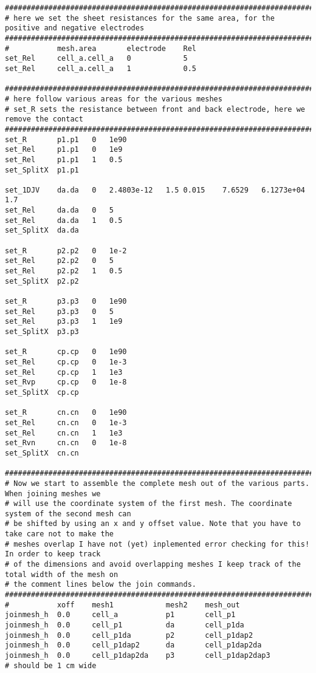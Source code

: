 \documentclass[noshowpacs,preprintnumbers,amsmath,amssymb, letter]{revtex4}
\begin{document}
\begin{small}
\begin{verbatim}
###################################################################################################
# here we set the sheet resistances for the same area, for the positive and negative electrodes
###################################################################################################
#           mesh.area       electrode    Rel
set_Rel     cell_a.cell_a   0            5
set_Rel     cell_a.cell_a   1            0.5

###################################################################################################
# here follow various areas for the various meshes
# set_R sets the resistance between front and back electrode, here we remove the contact
###################################################################################################
set_R       p1.p1   0   1e90
set_Rel     p1.p1   0   1e9
set_Rel     p1.p1   1   0.5
set_SplitX  p1.p1

set_1DJV    da.da   0   2.4803e-12   1.5 0.015    7.6529   6.1273e+04  1.7
set_Rel     da.da   0   5
set_Rel     da.da   1   0.5
set_SplitX  da.da
  
set_R       p2.p2   0   1e-2
set_Rel     p2.p2   0   5
set_Rel     p2.p2   1   0.5
set_SplitX  p2.p2

set_R       p3.p3   0   1e90
set_Rel     p3.p3   0   5
set_Rel     p3.p3   1   1e9
set_SplitX  p3.p3

set_R       cp.cp   0   1e90
set_Rel     cp.cp   0   1e-3
set_Rel     cp.cp   1   1e3
set_Rvp     cp.cp   0   1e-8
set_SplitX  cp.cp

set_R       cn.cn   0   1e90
set_Rel     cn.cn   0   1e-3
set_Rel     cn.cn   1   1e3
set_Rvn     cn.cn   0   1e-8
set_SplitX  cn.cn

###################################################################################################
# Now we start to assemble the complete mesh out of the various parts. When joining meshes we 
# will use the coordinate system of the first mesh. The coordinate system of the second mesh can 
# be shifted by using an x and y offset value. Note that you have to take care not to make the 
# meshes overlap I have not (yet) inplemented error checking for this! In order to keep track 
# of the dimensions and avoid overlapping meshes I keep track of the total width of the mesh on 
# the comment lines below the join commands.
###################################################################################################
#           xoff    mesh1            mesh2    mesh_out
joinmesh_h  0.0     cell_a           p1       cell_p1    
joinmesh_h  0.0     cell_p1          da       cell_p1da
joinmesh_h  0.0     cell_p1da        p2       cell_p1dap2
joinmesh_h  0.0     cell_p1dap2      da       cell_p1dap2da    
joinmesh_h  0.0     cell_p1dap2da    p3       cell_p1dap2dap3        
# should be 1 cm wide        


\end{verbatim}
\end{small}
\end{document}

